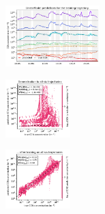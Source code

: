 \begin{figure}[H]
    \begin{subfigure}
    \centering
    \includegraphics[width=0.4\textwidth]{prediction/figures/models/linearmodel-training-prediction.pdf}
    \end{subfigure}
    \begin{subfigure}
    \centering
    \includegraphics[width=0.275\textwidth]{prediction/figures/models/linearmodel-test-generalisation.pdf}
    \end{subfigure}
    \begin{subfigure}
    \centering
    \includegraphics[width=0.275\textwidth]{prediction/figures/models/linearmodel-test-prediction.pdf}
    \end{subfigure}
   

\end{figure}
